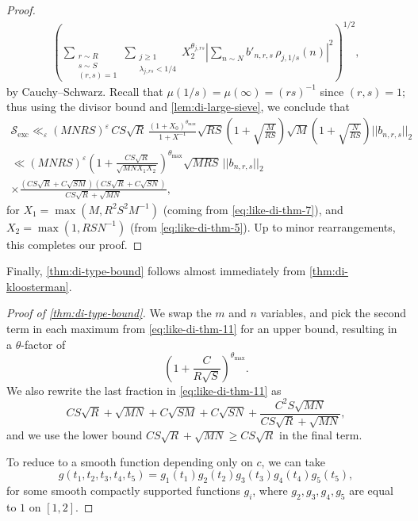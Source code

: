 \documentclass[reqno,11pt]{amsart}
\theoremstyle{definition}
\theoremstyle{remark}
\numberwithin{equation}{section}
\newcommand{\mS}{\mathcal{S}}
\newcommand{\eps}{\varepsilon}
\begin{document}
\begin{proof}
\[\begin{aligned}
    \left(\sum_{\substack{r \sim R \\ s \sim S \\ (r, s) = 1}} \sum_{\substack{j \ge 1 \\ \lambda_{j,rs} < 1/4}} X_2^{\theta_{j,rs}} \left\vert \sum_{n \sim N} b'_{n,r,s}\, \rho_{j,1/s}(n) \right\vert^2 \right)^{1/2},
\end{aligned}
\]
by Cauchy--Schwarz. Recall that $\mu(1/s) = \mu(\infty) = (rs)^{-1}$ since $(r, s) = 1$; thus using the divisor bound and \cref{lem:di-large-sieve}, we conclude that
\[
\begin{aligned}
    \mS_{\text{exc}} \ll_\eps 
    (MNRS)^\eps\,
    CS\sqrt{R}\, \frac{\left(1 + X_0\right)^{\theta_{\max}}}{1 + X^{-1}} 
    \sqrt{RS} 
    \left(1 + \sqrt{\frac{M}{RS}}\right) \sqrt{M}
    \left(1 + \sqrt{\frac{N}{RS}}\right) ||b_{n,r,s}||_2
    \\
    \ll
    (MNRS)^\eps \left(1 + \frac{CS\sqrt{R}}{\sqrt{MNX_1X_2}}\right)^{\theta_{\max}} \sqrt{MRS}\, ||b_{n,r,s}||_2
    \\
    \times
    \frac{\left(CS\sqrt{R} + C\sqrt{SM}\right)\left(CS\sqrt{R} + C\sqrt{SN}\right)}{CS\sqrt{R} + \sqrt{MN}},
\end{aligned}
\]
for $X_1 = \max(M, R^2S^2M^{-1})$ (coming from \cref{eq:like-di-thm-7}), and $X_2 = \max(1, RSN^{-1})$ (from \cref{eq:like-di-thm-5}). Up to minor rearrangements, this completes our proof.
\end{proof}


Finally, \cref{thm:di-type-bound} follows almost immediately from \cref{thm:di-kloosterman}.

\begin{proof}[Proof of \cref{thm:di-type-bound}]
We swap the $m$ and $n$ variables, and pick the second term in each maximum from \cref{eq:like-di-thm-11} for an upper bound, resulting in a $\theta$-factor of
\[
    \left(1 + \frac{C}{R\sqrt{S}} \right)^{\theta_{\max}}.
\]
We also rewrite the last fraction in \cref{eq:like-di-thm-11} as
\[
    CS\sqrt{R} + \sqrt{MN} + C\sqrt{SM} + C\sqrt{SN} + \frac{C^2 S \sqrt{MN}}{CS\sqrt{R} + \sqrt{MN}},
\]
and we use the lower bound $CS\sqrt{R} + \sqrt{MN} \ge CS\sqrt{R}$ in the final term. 

To reduce to a smooth function depending only on $c$, we can take
\[
    g(t_1, t_2, t_3, t_4, t_5) = 
    g_1\left(t_1\right) 
    g_2\left(t_2\right)
    g_3\left(t_3\right)
    g_4\left(t_4\right)
    g_5\left(t_5\right),
\]
for some smooth compactly supported functions $g_i$, where $g_2, g_3, g_4, g_5$ are equal to $1$ on $[1, 2]$.

\end{proof}
\end{document}
